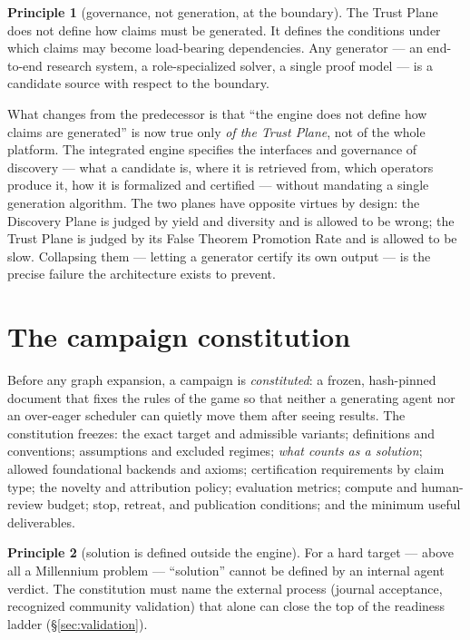 \documentclass[11pt]{amsart}
\theoremstyle{definition}
\newtheorem{principle}{Principle}
\theoremstyle{remark}
\begin{document}
\begin{principle}[governance, not generation, at the boundary]\label{pr:governs}
The Trust Plane does not define how claims must be generated. It defines the
conditions under which claims may become load-bearing dependencies. Any
generator --- an end-to-end research system, a role-specialized solver, a single
proof model --- is a candidate source with respect to the boundary.
\end{principle}

What changes from the predecessor is that ``the engine does not define how claims
are generated'' is now true only \emph{of the Trust Plane}, not of the whole
platform. The integrated engine specifies the interfaces and governance of
discovery --- what a candidate is, where it is retrieved from, which operators
produce it, how it is formalized and certified --- without mandating a single
generation algorithm. The two planes have opposite virtues by design: the
Discovery Plane is judged by yield and diversity and is allowed to be wrong; the
Trust Plane is judged by its False Theorem Promotion Rate and is allowed to be
slow. Collapsing them --- letting a generator certify its own output --- is the
precise failure the architecture exists to prevent.

\section{The campaign constitution}\label{sec:constitution}

Before any graph expansion, a campaign is \emph{constituted}: a frozen,
hash-pinned document that fixes the rules of the game so that neither a
generating agent nor an over-eager scheduler can quietly move them after seeing
results. The constitution freezes: the exact target and admissible variants;
definitions and conventions; assumptions and excluded regimes; \emph{what counts
as a solution}; allowed foundational backends and axioms; certification
requirements by claim type; the novelty and attribution policy; evaluation
metrics; compute and human-review budget; stop, retreat, and publication
conditions; and the minimum useful deliverables.

\begin{principle}[solution is defined outside the engine]\label{pr:solution}
For a hard target --- above all a Millennium problem --- ``solution'' cannot be
defined by an internal agent verdict. The constitution must name the external
process (journal acceptance, recognized community validation) that alone can
close the top of the readiness ladder (\S\ref{sec:validation}).
\end{principle}
\end{document}
